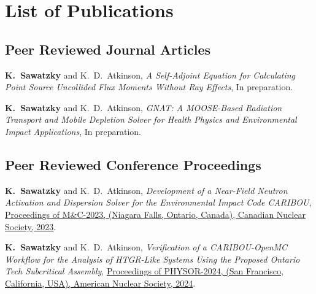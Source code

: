 \chapter*{List of Publications}
\label{publications}

\section*{\textbf{Peer Reviewed Journal Articles}}
\begin{enumerate}
{
    \item \textbf{K.\ Sawatzky} and {K.\ D.\ Atkinson}, \textit{A Self-Adjoint Equation for Calculating Point Source Uncollided Flux Moments Without Ray Effects}, In preparation.

    \item \textbf{K.\ Sawatzky} and {K.\ D.\ Atkinson}, \textit{GNAT: A MOOSE-Based Radiation Transport and Mobile Depletion Solver for Health Physics and Environmental Impact Applications}, In preparation.
}
\end{enumerate}

\section*{\textbf{Peer Reviewed Conference Proceedings}}
\begin{enumerate}
{
    \item \textbf{K.\ Sawatzky} and {K.\ D.\ Atkinson}, \textit{Development of a Near-Field Neutron Activation and Dispersion Solver for the Environmental Impact Code CARIBOU}, \href{https://mc2023.com/}{Proceedings of M\&C-2023, (Niagara Falls, Ontario, Canada), Canadian Nuclear Society, 2023}.
    
    \item \textbf{K.\ Sawatzky} and {K.\ D.\ Atkinson}, \textit{Verification of a CARIBOU-OpenMC Workflow for the Analysis of HTGR-Like Systems Using the Proposed Ontario Tech Subcritical Assembly}, \href{https://www.ans.org/meetings/physor2024/}{Proceedings of PHYSOR-2024, (San Francisco, California, USA), American Nuclear Society, 2024}.
}
\end{enumerate}

